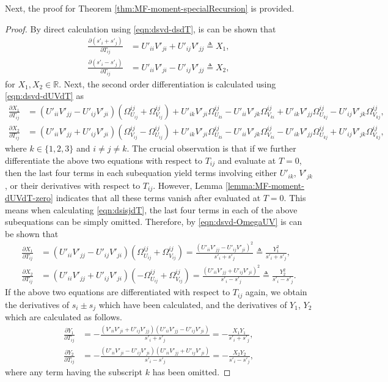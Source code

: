 Next, the proof for Theorem \ref{thm:MF-moment-specialRecursion} is provided.
\begin{proof}
	By direct calculation using \eqref{eqn:dsvd-dsdT}, is can be shown that
	\begin{align*}
		\frac{\partial (s'_i+s'_j)}{\partial T_{ij}} &= U'_{ii}V'_{ji} + U'_{ij}V'_{jj} \triangleq X_1, \\
		\frac{\partial (s'_i-s'_j)}{\partial T_{ij}} &= U'_{ii}V'_{ji} - U'_{ij}V'_{jj} \triangleq X_2,
	\end{align*}
	for $X_1,X_2\in\mathbb{R}$.
	Next, the second order differentiation is calculated using \eqref{eqn:dsvd-dUVdT} as
	\begin{align*}
		\frac{\partial X_1}{\partial T_{ij}}
		&= (U'_{ii}V'_{jj}-U'_{ij}V'_{ji})(\Omega_{U_{ij}}^{ij}+\Omega_{V_{ij}}^{ij}) + U'_{ik}V'_{ji}\Omega_{U_{ki}}^{ij} - U'_{ii}V'_{jk}\Omega_{V_{ki}}^{ij} + U'_{ik}V'_{jj}\Omega_{U_{kj}}^{ij} - U'_{ij}V'_{jk}\Omega_{V_{kj}}^{ij}, \\
		\frac{\partial X_2}{\partial T_{ij}} &= (U'_{ii}V'_{jj}+U'_{ij}V'_{ji})(\Omega_{V_{ij}}^{ij}-\Omega_{U_{ij}}^{ij}) + U'_{ik}V'_{ji}\Omega_{U_{ki}}^{ij} - U'_{ii}V'_{jk}\Omega_{V_{ki}}^{ij} - U'_{ik}V'_{jj}\Omega_{U_{kj}}^{ij} + U'_{ij}V'_{jk}\Omega_{V_{kj}}^{ij},
	\end{align*}
	where $k\in\{1,2,3\}$ and $i\neq j\neq k$.
	The crucial observation is that if we further differentiate the above two equations with respect to $T_{ij}$ and evaluate at $T=0$, then the last four terms in each subequation yield terms involving either $U'_{ik}$, $V'_{jk}$, or their derivatives with respect to $T_{ij}$.
	However, Lemma \ref{lemma:MF-moment-dUVdT-zero} indicates that all these terms vanish after evaluated at $T=0$.
	This means when calculating \eqref{eqn:dsisjdT}, the last four terms in each of the above subequations can be simply omitted.
	Therefore, by \eqref{eqn:dsvd-OmegaUV} is can be shown that
	\begin{align*}
		\frac{\partial X_1}{\partial T_{ij}} &= (U'_{ii}V'_{jj}-U'_{ij}V'_{ji})(\Omega_{U_{ij}}^{ij}+\Omega_{V_{ij}}^{ij}) = \frac{(U'_{ii}V'_{jj}-U'_{ij}V'_{ji})^2}{s'_i+s'_j} \triangleq \frac{Y_1^2}{s'_i+s'_j}, \\
		\frac{\partial X_2}{\partial T_{ij}} &= (U'_{ii}V'_{jj}+U'_{ij}V'_{ji})(-\Omega_{U_{ij}}^{ij}+\Omega_{V_{ij}}^{ij}) = \frac{(U'_{ii}V'_{jj}+U'_{ij}V'_{ji})^2}{s'_i-s'_j} \triangleq \frac{Y_2^2}{s'_i-s'_j}.
	\end{align*}
	If the above two equations are differentiated with respect to $T_{ij}$ again, we obtain the derivatives of $s_i \pm s_j$ which have been calculated, and the derivatives of $Y_1$, $Y_2$ which are calculated as follows.
	\begin{align*}
		\frac{\partial Y_1}{\partial T_{ij}} &= -\frac{(V'_{ii}V'_{ji}+U'_{ij}V'_{jj})(U'_{ii}V'_{jj}-U'_{ij}V'_{ji})}{s'_i+s'_j} = -\frac{X_1Y_1}{s'_i+s'_j}, \\
		\frac{\partial Y_2}{\partial T_{ij}} &= -\frac{(U'_{ii}V'_{ji}-U'_{ij}V'_{ji})(U'_{ii}V'_{jj}+U'_{ij}V'_{ji})}{s'_i-s'_j} = -\frac{X_2Y_2}{s'_i-s'_j},
	\end{align*}
	where any term having the subscript $k$ has been omitted. 
	

\end{proof}
